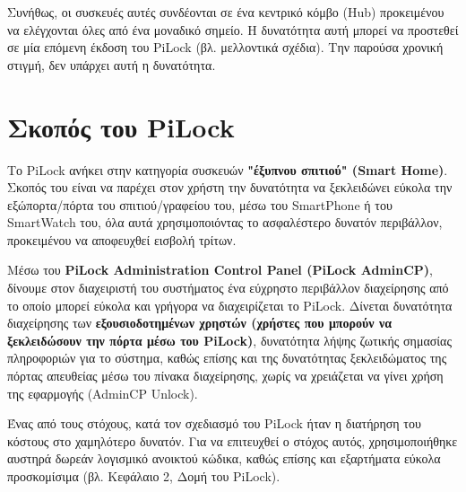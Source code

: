 	Συνήθως, οι συσκευές αυτές συνδέονται σε ένα κεντρικό κόμβο (Hub) προκειμένου να ελέγχονται όλες από ένα μοναδικό σημείο. Η δυνατότητα αυτή μπορεί να προστεθεί σε μία επόμενη έκδοση του PiLock (βλ. μελλοντικά σχέδια). Την παρούσα χρονική στιγμή, δεν υπάρχει αυτή η δυνατότητα.

\section{Σκοπός του PiLock}
	Το PiLock ανήκει στην κατηγορία συσκευών \textbf{"έξυπνου σπιτιού" (Smart Home)}. Σκοπός του είναι να παρέχει στον χρήστη την δυνατότητα να ξεκλειδώνει εύκολα την εξώπορτα/πόρτα του σπιτιού/γραφείου του, μέσω του SmartPhone ή του SmartWatch του, όλα αυτά χρησιμοποιόντας το ασφαλέστερο δυνατόν περιβάλλον, προκειμένου να αποφευχθεί εισβολή τρίτων.

	Μέσω του \textbf{PiLock Administration Control Panel (PiLock AdminCP)}, δίνουμε στον διαχειριστή του συστήματος ένα εύχρηστο περιβάλλον διαχείρησης από το οποίο μπορεί εύκολα και γρήγορα να διαχειρίζεται το PiLock. Δίνεται δυνατότητα διαχείρησης των \textbf{εξουσιοδοτημένων χρηστών (χρήστες που μπορούν να ξεκλειδώσουν την πόρτα μέσω του PiLock)}, δυνατότητα λήψης ζωτικής σημασίας πληροφοριών για το σύστημα, καθώς επίσης και της δυνατότητας ξεκλειδώματος της πόρτας απευθείας μέσω του πίνακα διαχείρησης, χωρίς να χρειάζεται να γίνει χρήση της εφαρμογής (AdminCP Unlock).

	Ένας από τους στόχους, κατά τον σχεδιασμό του PiLock ήταν η διατήρηση του κόστους στο χαμηλότερο δυνατόν. Για να επιτευχθεί ο στόχος αυτός, χρησιμοποιήθηκε αυστηρά δωρεάν λογισμικό ανοικτού κώδικα, καθώς επίσης και εξαρτήματα εύκολα προσκομίσιμα (βλ. Κεφάλαιο 2, Δομή του PiLock).
